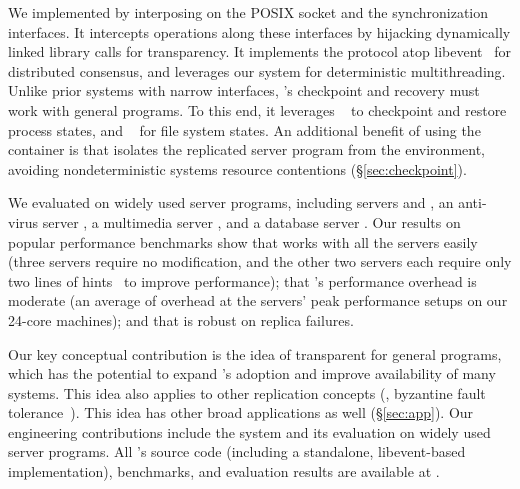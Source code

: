 

We implemented \xxx by interposing on the POSIX socket and the \pthread
synchronization interfaces.  It intercepts operations along these
interfaces by hijacking dynamically linked library calls for transparency.
It implements the \paxos protocol atop libevent~\cite{libevent} for
distributed consensus, and leverages our \parrot system for deterministic
multithreading.  Unlike prior \smr systems with narrow interfaces, \xxx's
checkpoint and recovery must work with general programs. To this end, it
leverages \criu~\cite{criu} to checkpoint and restore process states, and
\lxc~\cite{lxc} for file system states.  An additional benefit of using
the \lxc container is that \xxx isolates the replicated server program
from the environment, avoiding nondeterministic systems resource contentions 
(\S\ref{sec:checkpoint}).


We evaluated \xxx on \nprog widely used server programs,
including \http servers \apache and \mongoose, an anti-virus server
\clamav, a \upnp multimedia server \mediatomb, and a database server \mysql. 
Our results on popular performance benchmarks show that \xxx works with
all the servers easily (three servers require no modification, and the
other two servers each require only two lines of \parrot hints~\cite{parrot:sosp13}
to improve performance); that \xxx's performance overhead is
moderate (an average of \overhead overhead at the servers' peak 
performance setups on our 24-core machines); and that \xxx is robust on replica 
failures.

Our key conceptual contribution is the idea of transparent \smr for
general programs, which has the potential to expand \smr's
adoption and improve availability of many systems.  This idea also applies to 
other replication concepts (\eg, byzantine fault 
tolerance~\cite{pbft:osdi99,zyzzyva:sosp07}). This idea has other broad 
applications as well (\S\ref{sec:app}). Our engineering contributions 
include the \xxx system and its evaluation on widely used server
programs. All \xxx's source code (including a standalone, libevent-based
\paxos implementation), benchmarks, and evaluation results are available
at \github.

